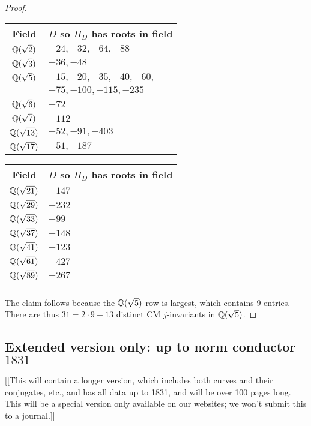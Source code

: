 \documentclass{amsart}
\begin{document}
\begin{proof}
\begin{center}
\begin{tabular}{|c|l|}\hline
Field & $D$ so $H_D$ has roots in field\\\hline
$\mathbb{Q}(\sqrt{2})$ & $-24,-32,-64,-88$ \\\hline
$\mathbb{Q}(\sqrt{3})$ & $-36,-48$ \\\hline
$\mathbb{Q}(\sqrt{5})$ & $-15,-20,-35,-40,-60,$ \\
             & $-75,-100,-115,-235$\\\hline
$\mathbb{Q}(\sqrt{6})$ & $-72$ \\\hline
$\mathbb{Q}(\sqrt{7})$ & $-112$ \\\hline
$\mathbb{Q}(\sqrt{13})$ & $-52,-91,-403$ \\\hline
$\mathbb{Q}(\sqrt{17})$ & $-51,-187$ \\\hline
\end{tabular}
\begin{tabular}{|c|l|}\hline
Field & $D$ so $H_D$ has roots in field\\\hline
$\mathbb{Q}(\sqrt{21})$ & $-147$ \\\hline
$\mathbb{Q}(\sqrt{29})$ & $-232$ \\\hline
$\mathbb{Q}(\sqrt{33})$ & $-99$ \\\hline
$\mathbb{Q}(\sqrt{37})$ & $-148$ \\\hline
$\mathbb{Q}(\sqrt{41})$ & $-123$ \\\hline
$\mathbb{Q}(\sqrt{61})$ & $-427$ \\\hline
$\mathbb{Q}(\sqrt{89})$ & $-267$ \\\hline
& \\\hline
\end{tabular}
\end{center}
The claim follows because the $\mathbb{Q}(\sqrt{5})$ row is largest, which
contains $9$ entries.  There are thus $31 = 2\cdot 9 + 13$ distinct CM $j$-invariants
in $\mathbb{Q}(\sqrt{5})$.

\end{proof}




\subsection{Extended version only: up to norm conductor  $1831$}\label{sec:to1831}

[[This will contain a longer version, which includes both curves and
their conjugates, etc., and has all data up to 1831, and will be over
100 pages long.  This will be a special version only available on our
websites; we won't submit this to a journal.]]



 

\end{document}
